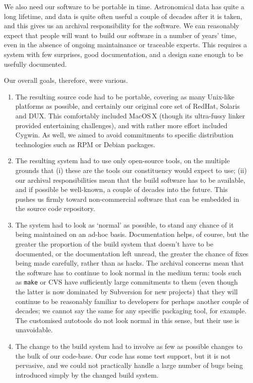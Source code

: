 \documentclass{speauth}
\begin{document}

We also need our software to be portable in time.  Astronomical data
has quite a long lifetime, and data is quite often useful a couple of
decades after it is taken, and this gives us an archival
responsibility for the software.  We can reasonably expect that people
will want to build our software in a number of years' time, even in
the absence of ongoing maintainance or traceable experts.  This
requires a system with few surprises, good documentation, and a design
sane enough to be usefully documented.

Our overall goals, therefore, were various.
\begin{enumerate}
\item \label{it:portable}The resulting source code had to be portable,
  covering as many Unix-like platforms as possible, and certainly our
  original core set of RedHat, Solaris and DUX.  This comfortably
  included MacOS\,X (though its ultra-fussy linker provided
  entertaining challenges), and with rather more effort included
  Cygwin.  As well, we aimed to avoid commitments to specific
  distribution technologies such as RPM or Debian packages.
\item The resulting system had to use only open-source tools, on the
  multiple grounds that
  (i) these are the tools our constituency would expect to use;
  (ii) our archival responsibilities mean that the build software has
  to be available, and if possible be well-known, a couple of decades
  into the future.  This pushes us firmly toward non-commercial
  software that can be embedded in the source code repository.
\item \label{it:normal}
  The system had to look as `normal' as possible, to stand any
  chance of it being maintained on an ad-hoc basis.  Documentation
  helps, of course, but the greater the proportion of the build system
  that doesn't have to be documented, or the documentation left
  unread, the greater the chance of fixes being made carefully, rather
  than as hacks.  The archival concerns mean that the software has to
  continue to look normal in the medium term: tools such as
  \texttt{make} or CVS have sufficiently large commitments to them
  (even though the latter is now dominated by Subversion for new
  projects) that they will continue to be reasonably familiar to
  developers for perhaps another couple of decades; we cannot say the
  same for any specific packaging tool, for example.  The customised
  autotools do not look normal in this sense, but their use is
  unavoidable.
\item The change to the build system had to involve as few as possible
  changes to the bulk of our code-base.  Our code has some test
  support, but it is not pervasive, and we could not practically
  handle a large number of bugs being introduced simply by the changed
  build system.
\end{enumerate}
\end{document}
